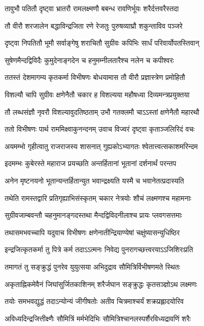 \twolineshloka
{तावुभौ पतितौ दृष्ट्वा भ्रातरौ रामलक्ष्मणौ}
{बबन्ध रावणिर्भूयः शरैर्दत्तवरैस्तदा}


\twolineshloka
{तौ वीरौ शरजालेन बद्धाविन्द्रजिता रणे}
{रेजतुः पुरुषव्याघ्रौ शकुन्ताविव पञ्जरे}


\twolineshloka
{दृष्ट्वा निपतितौ भूमौ सर्वाङ्गेषु शराचितौ}
{सुग्रीवः कपिभिः सार्धं परिवार्योपतस्तिवान्}


\twolineshloka
{सुषेणमैन्दद्विविदैः कुमुदेनाङ्गदेन च}
{हनुमम्नीलतारैश्च नलेन च कपीश्वरः}


\twolineshloka
{ततस्तं देशमागम्य कृतकर्मा विभीषणः}
{बोधयामास तौ वीरौ प्रज्ञास्त्रेण प्रमोहितौ}


\twolineshloka
{विशल्यौ चापि सुग्रीवः क्षणेनैतौ चकार ह}
{विशल्यया महौषध्या दिव्यमन्त्रप्रयुक्तया}


\twolineshloka
{तौ लब्धसंज्ञौ नृवरौ विशल्यावुदतिष्ठताम्}
{उभौ गतक्लमौ चाऽऽस्तां क्षणेनैतौ महारथौ}


\twolineshloka
{ततो विभीषणः पार्थ राममिक्ष्वाकुनन्दनम्}
{उवाच विज्वरं दृष्ट्वा कृताञ्जलिरिदं वचः}


\twolineshloka
{अयमम्भो गृहीत्वातु राजराजस्य शासनात्}
{गुह्यकोऽभ्यागतः श्वेतात्त्वत्सकाशमरिन्दम}


\twolineshloka
{इदमम्भः कुबेरस्ते महाराज प्रयच्छति}
{अन्तर्हितानां भूतानां दर्शनार्थं परन्तप}


\twolineshloka
{अनेन मृष्टनयनो भूतान्यन्तर्हितान्युत}
{भवान्द्रक्ष्यति यस्मै च भवानेतत्प्रदास्यति}


\twolineshloka
{तथेति रामस्तद्वारि प्रतिगृह्याभिसंस्कृतम्}
{चकार नेत्रयोः शौचं लक्ष्मणश्च महामनाः}


\twolineshloka
{सुग्रीवजाम्बवन्तौ चहनुमानङ्गदस्तथा}
{मैन्दद्विविदनीलाश्च प्रायः प्लवगसत्तमाः}


\twolineshloka
{तथासमभवच्चापि यदुवाच विभीषणः}
{क्षणेनातीन्द्रियाण्येषां चक्षुंष्यासन्युधिष्ठिर}


\twolineshloka
{इन्द्रजित्कृतकर्मा तु पित्रे कर्म तदाऽऽत्मनः}
{निवेद्य पुनरागच्छत्त्वरयाऽऽजिशिरःप्रति}


\twolineshloka
{तमागतं तु सङ्क्रुद्धं पुनरेव युयुत्सया}
{अभिदुद्राव सौमित्रिर्विभीषणमते स्थितः}


\twolineshloka
{अकृताह्निकमेवैनं जिघांसुर्जितकाशिनम्}
{शरैर्जघान सङ्क्रुद्धः कृतसञ्ज्ञोऽथ लक्ष्मणः}


\twolineshloka
{तयोः समभवद्युद्धं तदाऽन्योन्यं जीगीषतोः}
{अतीव चित्रमाश्चर्यं शक्रप्रह्लादयोरिव}


\twolineshloka
{अविध्यदिन्द्रजित्तीक्ष्णैः सौमित्रिं मर्मभेदिभिः}
{सौमित्रिश्चानलस्पर्शैरविध्यद्रावणिं शरैः}


